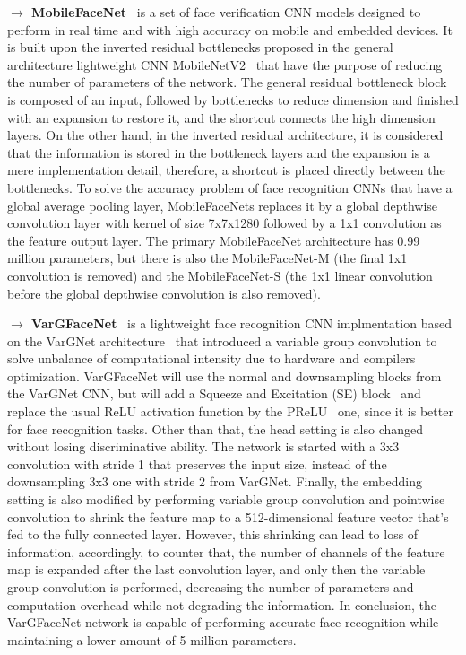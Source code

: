 \documentclass[class=report, crop=false, a4paper, 12pt]{standalone}
\begin{document}
\vspace{0.7\baselineskip}
\label{mobilefacenet}
\noindent\textbf{$\rightarrow$ MobileFaceNet}~\autocite{chenMobileFaceNetsEfficientCNNs2018} is a set of face verification CNN models designed to perform in real time and with high accuracy on mobile and embedded devices. It is built upon the inverted residual bottlenecks proposed in the general architecture lightweight CNN MobileNetV2~\autocite{sandlerMobileNetV2InvertedResiduals2019} that have the purpose of reducing the number of parameters of the network. The general residual bottleneck block~\autocite{heDeepResidualLearning2016} is composed of an input, followed by bottlenecks to reduce dimension and finished with an expansion to restore it, and the shortcut connects the high dimension layers. On the other hand, in the inverted residual architecture, it is considered that the information is stored in the bottleneck layers and the expansion is a mere implementation detail, therefore, a shortcut is placed directly between the bottlenecks. To solve the accuracy problem of face recognition CNNs that have a global average pooling layer, MobileFaceNets replaces it by a global depthwise convolution layer with kernel of size 7x7x1280 followed by a 1x1 convolution as the feature output layer. The primary MobileFaceNet architecture has 0.99 million parameters, but there is also the MobileFaceNet-M (the final 1x1 convolution is removed) and the MobileFaceNet-S (the 1x1 linear convolution before the global depthwise convolution is also removed).

\newpage
\noindent\textbf{$\rightarrow$ VarGFaceNet}~\autocite{yanVarGFaceNetEfficientVariable2019} is a lightweight face recognition CNN implmentation based on the VarGNet architecture~\autocite{zhangVarGNetVariableGroup2020} that introduced a variable group convolution to solve unbalance of computational intensity due to hardware and compilers optimization. VarGFaceNet will use the normal and downsampling blocks from the VarGNet CNN, but will add a Squeeze and Excitation (SE) block~\autocite{huSqueezeandExcitationNetworks2019} and replace the usual ReLU activation function by the PReLU~\autocite{heDelvingDeepRectifiers2015} one, since it is better for face recognition tasks. Other than that, the head setting is also changed without losing discriminative ability. The network is started with a 3x3 convolution with stride 1 that preserves the input size, instead of the downsampling 3x3 one with stride 2 from VarGNet. Finally, the embedding setting is also modified by performing variable group convolution and pointwise convolution to shrink the feature map to a 512-dimensional feature vector that's fed to the fully connected layer. However, this shrinking can lead to loss of information, accordingly, to counter that, the number of channels of the feature map is expanded after the last convolution layer, and only then the variable group convolution is performed, decreasing the number of parameters and computation overhead while not degrading the information. In conclusion, the VarGFaceNet network is capable of performing accurate face recognition while maintaining a lower amount of 5 million parameters.
\end{document}
